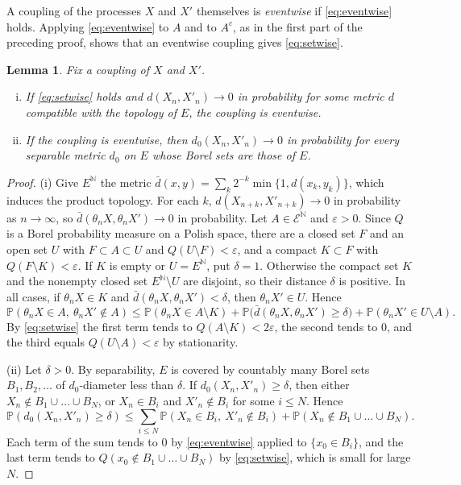 \documentclass[11pt]{amsart}
\newtheorem{lemma}[theorem]{Lemma}
\theoremstyle{definition}
\theoremstyle{remark}
\newcommand{\N}{\mathbb N}
\newcommand{\Prob}{\mathbb P}
\newcommand{\cE}{\mathcal E}
\begin{document}
A coupling of the processes $X$ and $X'$ themselves is \emph{eventwise} if \eqref{eq:eventwise} holds. Applying
\eqref{eq:eventwise} to $A$ and to $A^c$, as in the first part of the preceding proof, shows that an eventwise coupling
gives \eqref{eq:setwise}.

\begin{lemma}\label{lem:closeness}
Fix a coupling of $X$ and $X'$.
\begin{enumerate}[(i)]
\item If \eqref{eq:setwise} holds and $d(X_n,X'_n)\to0$ in probability for some metric $d$ compatible with the
topology of $E$, the coupling is eventwise.
\item If the coupling is eventwise, then $d_0(X_n,X'_n)\to0$ in probability for every separable metric $d_0$ on $E$
whose Borel sets are those of $E$.
\end{enumerate}
\end{lemma}

\begin{proof}
(i) Give $E^\N$ the metric $\bar d(x,y)=\sum_k2^{-k}\min\{1,d(x_k,y_k)\}$, which induces the product topology. For each
$k$, $d(X_{n+k},X'_{n+k})\to0$ in probability as $n\to\infty$, so $\bar d(\theta_nX,\theta_nX')\to0$ in probability.
Let $A\in\cE^\N$ and $\varepsilon>0$. Since $Q$ is a Borel probability measure on a Polish space, there are a closed
set $F$ and an open set $U$ with $F\subset A\subset U$ and $Q(U\setminus F)<\varepsilon$, and a compact $K\subset F$
with $Q(F\setminus K)<\varepsilon$. If $K$ is empty or $U=E^\N$, put $\delta=1$. Otherwise the compact set $K$ and
the nonempty closed set $E^\N\setminus U$ are disjoint, so their distance $\delta$ is positive. In all cases, if
$\theta_nX\in K$ and $\bar d(\theta_nX,\theta_nX')<\delta$, then $\theta_nX'\in U$. Hence
\[
\Prob(\theta_nX\in A,\ \theta_nX'\notin A)\le\Prob(\theta_nX\in A\setminus K)+\Prob\bigl(\bar d(\theta_nX,\theta_nX')
\ge\delta\bigr)+\Prob(\theta_nX'\in U\setminus A).
\]
By \eqref{eq:setwise} the first term tends to $Q(A\setminus K)<2\varepsilon$, the second tends to $0$, and the third
equals $Q(U\setminus A)<\varepsilon$ by stationarity.

(ii) Let $\delta>0$. By separability, $E$ is covered by countably many Borel sets $B_1,B_2,\dots$ of $d_0$-diameter
less than $\delta$. If $d_0(X_n,X'_n)\ge\delta$, then either $X_n\notin B_1\cup\dots\cup B_N$, or $X_n\in B_i$ and
$X'_n\notin B_i$ for some $i\le N$. Hence
\[
\Prob(d_0(X_n,X'_n)\ge\delta)\le\sum_{i\le N}\Prob(X_n\in B_i,\ X'_n\notin B_i)+\Prob(X_n\notin B_1\cup\dots\cup B_N).
\]
Each term of the sum tends to $0$ by \eqref{eq:eventwise} applied to $\{x_0\in B_i\}$, and the last term tends to
$Q(x_0\notin B_1\cup\dots\cup B_N)$ by \eqref{eq:setwise}, which is small for large $N$.
\end{proof}
\end{document}
